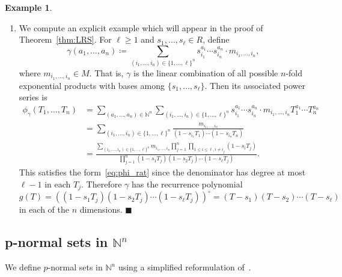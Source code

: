 \documentclass[letterpaper, 11pt, thm-restate]{article}
\numberwithin{equation}{section}
\newcommand{\N}{\mathbb{N}}
\theoremstyle{definition}
\theoremstyle{definition}
\newtheorem{example}[theorem]{Example}
\theoremstyle{definition}
\begin{document}
\begin{example}
\begin{enumerate}[label=(\roman*), topsep=0pt, itemsep=0em, leftmargin=0.7cm]
        \item
        We compute an explicit example which will appear in the proof of Theorem~\ref{thm:LRS}.
        For $\ell \geq 1$ and $s_1, \ldots, s_{\ell} \in R$, define
        \[
        \gamma(a_1, \ldots, a_n) \coloneqq \sum_{(i_1, \ldots, i_n) \in \{1, \ldots, \ell\}^n} s_{i_1}^{a_1} \cdots s_{i_n}^{a_n} \cdot m_{i_1, \ldots, i_n},
        \]
        where $m_{i_1, \ldots, i_n} \in M$.
        That is, $\gamma$ is the linear combination of all possible $n$-fold exponential products with bases among $\{s_1, \ldots, s_{\ell}\}$.
        Then its associated power series is
        \begin{align*}
        \phi_{\gamma}(T_1, \ldots, T_n) & = \sum_{(a_1, \ldots, a_n) \in \N^n} \sum_{(i_1, \ldots, i_n) \in \{1, \ldots, \ell\}^n} s_{i_1}^{a_1} \cdots s_{i_n}^{a_n} \cdot m_{i_1, \ldots, i_n} T_1^{a_1} \cdots T_n^{a_n} \\
        & = \sum_{(i_1, \ldots, i_n) \in \{1, \ldots, \ell\}^n} \frac{m_{i_1, \ldots, i_n}}{(1-s_{i_1}T_1) \cdots (1-s_{i_n}T_n)} \\
        & = \frac{\sum_{(i_1, \ldots, i_n) \in \{1, \ldots, \ell\}^n} m_{i_1, \ldots, i_n} \prod_{j = 1}^n \prod_{1 \leq i \leq \ell, i \neq i_j} (1-s_{i}T_j)}{\prod_{j = 1}^n (1-s_1T_j) (1-s_2T_j) \cdots (1-s_{\ell}T_j)}.
        \end{align*}
        This satisfies the form~\eqref{eq:phi_rat} since the denominator has degree at most $\ell-1$ in each $T_j$.
        Therefore $\gamma$ has the recurrence polynomial $g(T) = ((1-s_1T_j) (1-s_2T_j) \cdots (1-s_{\ell}T_j))^{\circ} = (T - s_1)(T - s_2) \cdots (T - s_{\ell})$ in each of the $n$ dimensions.
        \hfill $\blacksquare$
    \end{enumerate}
\end{example}
 
\subsection{p-normal sets in $\N^n$}\label{subsec:pnormal_N}
We define $p$-normal sets in $\mathbb N^n$ using a simplified reformulation of~\cite{derksen2015linear}.
\end{document}
